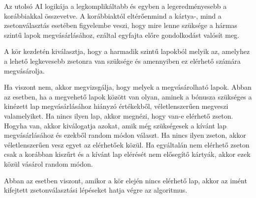 
Az utolsó AI logikája a legkomplikáltabb és egyben a legeredményesebb a korábbiakkal összevetve. A korábbiaktól eltérőenmind a kártya-, mind a zsetonválasztás esetében figyelembe veszi, hogy mire lenne szüksége a hármas szintű lapok megvásárlásához, ezáltal egyfajta előre gondolkodást valósít meg.

A kör kezdetén kiválasztja, hogy a harmadik szintű lapokból melyik az, amelyhez a lehető legkevesebb zsetonra van szüksége és amennyiben ez elérhető számára megvásárolja.

Ha viszont nem, akkor megvizsgálja, hogy melyek a megvásárolható lapok. Abban az esetben, ha a megvehető lapok között van olyan, aminek a bónusza szükséges a kinézett lap megvásárlásához hiányzó értékekből, véletlenszerűen megveszi valamelyiket. Ha nincs ilyen lap, akkor megnézi, hogy van-e elérhető zseton. Hogyha van, akkor kiválogatja azokat, amik még szükségesek a kívánt lap megvásárlásához és ezekből random módon választ. Ha nincs ilyen zseton, akkor véletlenszerűen vesz egyet az elérhetőek közül. Ha egyáltalán nem elérhető zseton csak a korábban kiszűrt és a kívánt lap elérését nem elősegítő kártyák, akkor ezek közül vásárol random módon.

Abban az esetben viszont, amikor a kör elején nincs elérhető lap, akkor az imént kifejtett zsetonválasztási lépéseket hatja végre az algoritmus.